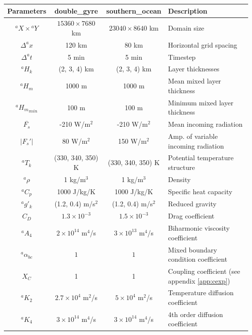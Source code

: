 \documentclass[11pt, a4paper,twoside]{article}
\newcommand{\rhb}[1]{{{}^{#1}\rho}}
\newcommand{\gp}[2]{{}^{#1}g'_{#2}}
\newcommand{\cp}[1]{{{}^{#1}C_p}}
\newcommand{\HH}[2]{{{}^{#1}H_{#2}}}
\newcommand{\ah}[1]{{{}^{#1}A_4}}
\newcommand{\kh}[1]{{{}^{#1}K_2}}
\newcommand{\kf}[1]{{{}^{#1}K_4}}
\newcommand{\T}[2]{{{}^{#1}T_{#2}}}
\newcommand{\alphbc}[1]{{}^{#1}\alpha_{bc}}
\numberwithin{equation}{section}
\begin{document}
\begin{table}[!t]
  \begin{center}
    \begin{tabular}{cccl}
\hline
Parameters  & \hspace{4mm}double\_gyre\hspace{4mm} &  \hspace{4mm}southern\_ocean\hspace{4mm} & Description\hspace{4mm} \\
\hline
${}^a X \times{}^a Y$ & $15360 \times 7680$ km & $23040 \times 8640$ km &Domain size  \\
$\Delta^ax$ & 120 km & 80 km &Horizontal grid spacing\\
$\Delta^at$ & 5 min &  5 min&Timestep\\
$\HH{a}{k}$ & (2, 3, 4) km &(2, 3, 4) km &  Layer thicknesses\\
$\HH{a}{m}$ & 1000 m & 1000 m & Mean mixed layer thickness\\
$\HH{a}{m}_{min}$ & 100 m &100 m & Minimum mixed layer thickness\\
$\overline{F_s}$ & -210 W/m${}^2$ & -210 W/m${}^2$ & Mean incoming radiation\\
$\lvert F_s' \rvert$& 80 W/m${}^2$ & 150 W/m${}^2$ & Amp. of variable incoming radiation\\
$\T{a}{k}$ & (330, 340, 350) K & (330, 340, 350) K & Potential temperature structure\\
$\rhb{a}$ & 1 kg/m${}^3$ &1 kg/m${}^3$ & Density\\
$\cp{a}$ & 1000 J/kg/K &1000 J/kg/K & Specific heat capacity\\
$\gp{a}{k}$ & (1.2, 0.4) m/s${}^2$& (1.2, 0.4) m/s${}^2$&Reduced gravity\\
$C_D$ & $1.3 \times 10^{-3}$  &$1.5 \times 10^{-3}$  & Drag coefficient\\
$\ah{a}$ & $2 \times 10^{14}$ m${}^4$/s &$3 \times 10^{13}$ m${}^4$/s & Biharmonic viscosity coefficient\\
$\alphbc{a}$ & $1$ &$1$ & Mixed boundary condition coefficient\\
$X_C $ & 1 &1 & Coupling coefficient (see appendix \ref{app:cexp})\\
$\kh{a}$ & $2.7 \times 10^4$ m$^2$/s &  $5 \times 10^4$ m$^2$/s &Temperature diffusion coefficient\\
$\kf{a}$ & $3 \times 10^{14}$ m$^4$/s & $3 \times 10^{14}$ m$^4$/s & 4th order diffusion coefficient\\

\end{tabular}
\end{center}
\end{table}
\end{document}
